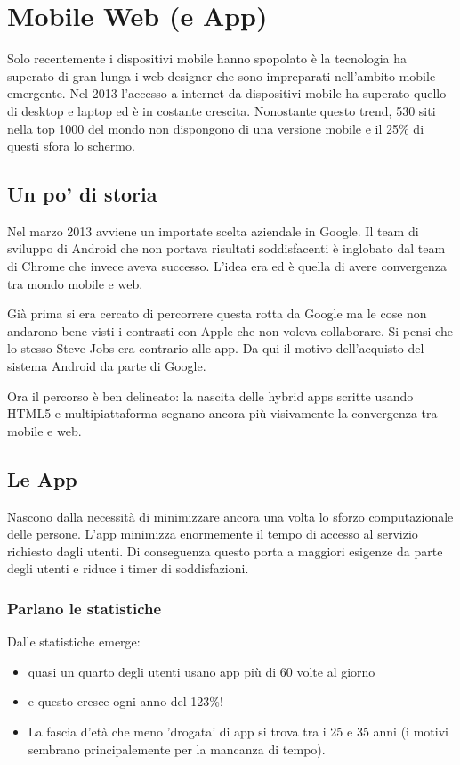 
\section{Mobile Web (e App)}
	Solo recentemente i dispositivi mobile hanno spopolato è la tecnologia ha superato di gran lunga i web designer che sono impreparati nell'ambito mobile emergente. Nel 2013 l'accesso a internet da dispositivi mobile ha superato quello di desktop e laptop ed è in costante crescita. Nonostante questo trend, 530 siti nella top 1000 del mondo non dispongono di una versione mobile e il 25\% di questi sfora lo schermo.

	\subsection{Un po' di storia}
		Nel marzo 2013 avviene un importate scelta aziendale in Google. Il team di sviluppo di Android che non portava risultati soddisfacenti è inglobato dal team di Chrome che invece aveva successo. L'idea era ed è quella di avere convergenza tra mondo mobile e web. 
		
		Già prima si era cercato di percorrere questa rotta da Google ma le cose non andarono bene visti i contrasti con Apple che non voleva collaborare. Si pensi che lo stesso Steve Jobs era contrario alle app. Da qui il motivo dell'acquisto del sistema Android da parte di Google.
		
		Ora il percorso è ben delineato: la nascita delle hybrid apps scritte usando HTML5 e multipiattaforma segnano ancora più visivamente la convergenza tra mobile e web.
	
	\subsection{Le App}
		Nascono dalla necessità di minimizzare ancora una volta lo sforzo computazionale delle persone. L'app minimizza enormemente il tempo di accesso al servizio richiesto dagli utenti. Di conseguenza questo porta a maggiori esigenze da parte degli utenti e riduce i timer di soddisfazioni.
		
		\subsubsection{Parlano le statistiche}
			Dalle statistiche emerge:
			\begin{itemize}
				\item quasi un quarto degli utenti usano app più di 60 volte al giorno 
				\item e questo cresce ogni anno del 123\%!
				\item La fascia d'età che meno 'drogata' di app si trova tra i 25 e 35 anni (i motivi sembrano principalemente per la mancanza di tempo).
			\end{itemize}

